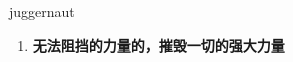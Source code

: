 
\begin{frame}
{\huge juggernaut}
\begin{center}
\begin{enumerate}\Large
  \item \textbf{无法阻挡的力量的，摧毁一切的强大力量}
\end{enumerate}
\end{center}
\end{frame}

